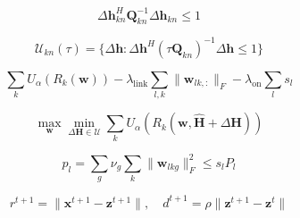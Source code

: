 \[\Delta\mathbf{h}_{kn}^{H}\mathbf{Q}_{kn}^{-1}\Delta\mathbf{h}_{kn}\leq 1\]

\[\mathcal{U}_{kn}(\tau)=\{\Delta\mathbf{h}:\Delta\mathbf{h}^{H}(\tau\mathbf{Q}_{kn})^{-1}\Delta\mathbf{h}\leq1\}\]

\[\sum_k U_{\alpha}(R_k(\mathbf{w}))-\lambda_{\mathrm{link}}\sum_{l,k}\|\mathbf{w}_{lk,:}\|_F-\lambda_{\mathrm{on}}\sum_l s_l\]

\[\max_{\mathbf{w}}\min_{\Delta\mathbf{H}\in\mathcal{U}}\sum_k U_{\alpha}(R_k(\mathbf{w},\widehat{\mathbf{H}}+\Delta\mathbf{H}))\]

\[p_l=\sum_g\nu_g\sum_k\|\mathbf{w}_{lkg}\|_F^2\leq s_lP_l\]

\[r^{t+1}=\|\mathbf{x}^{t+1}-\mathbf{z}^{t+1}\|,\quad d^{t+1}=\rho\|\mathbf{z}^{t+1}-\mathbf{z}^t\|\]
